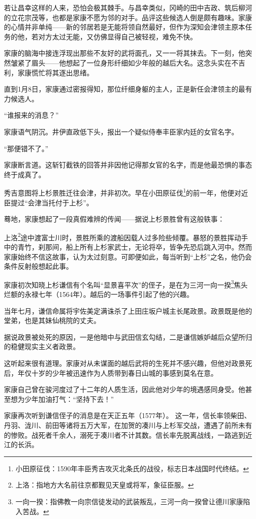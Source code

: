 \documentclass[
]{article}
\begin{document}
若让昌幸这样的人来，恐怕会极其棘手。与昌幸类似，冈崎的田中吉政、筑后柳河的立花宗茂等，也都是家康不愿为邻的对手。品评这些候选人倒是颇有趣味。家康的心情并非单纯------新的邻居若是无能将领自然最好，但作为深知会津领主原本任务的他，若对方太过无能，又仿佛显得自己被轻视，难免不快。

家康的脑海中接连浮现出那些不友好的武将面孔，又一一将其抹去。下一刻，他突然皱紧了眉头------他想起了一位身形纤细如少年般的越后大名。这念头实在不吉利，家康慌忙将其逐出思绪。

直到1月8日，家康通过密报得知，那位纤细身躯的主人，正是新任会津领主的最有力候选人。

``谁报来的消息？''

家康语气阴沉。井伊直政低下头，报出一个疑似侍奉丰臣家内廷的女官名字。

``那便错不了。''

家康断言道。这斩钉截铁的回答并非因他记得那女官的名字，而是他最恐惧的事态终于成真了。

秀吉意图将上杉景胜迁往会津，并非初次。早在小田原征伐\footnote{小田原征伐：1590年丰臣秀吉攻灭北条氏的战役，标志日本战国时代终结。}的前一年，他便对近臣提过``会津当托付于上杉''。

蓦地，家康想起了一段真假难辨的传闻------据说上杉景胜曾有这般轶事：

上洛\footnote{上洛：指地方大名前往京都觐见天皇或将军，象征臣服。}途中渡富士川时，景胜所乘的渡船因载人过多险些倾覆。暴怒的景胜挥动手中的青竹，刹那间，船上所有上杉家武士，无论将卒，皆争先恐后跳入河中。然而家康始终不信这故事，认为太过刻意。可即便如此，每当听到``上杉''之名，他仍会条件反射般想起此事。

家康初次知晓上杉谦信有个名叫``显景喜平次''的侄子，是在为三河一向一揆\footnote{一向一揆：指佛教一向宗信徒发动的武装叛乱，三河一向一揆曾让德川家康陷入苦战。}焦头烂额的永禄七年（1564年）。越后的一场事件引起了他的兴趣。

当年七月，谦信命属将宇佐美定满诛杀了上田庄坂户城主长尾政景。政景既是他的堂弟，也是其妹仙桃院的丈夫。

据说政景被处死的原因，一是他暗中与武田信玄勾结，二是谦信嫉妒越后众望所归的稳健现实主义者政景。

这听起来很有道理。家康对从未谋面的越后武将的生死并不感兴趣，但他对政景死后，年仅十岁的少年被迅速作为人质带到春日山城的事感到莫名在意。

家康自己曾在骏河度过了十二年的人质生活，因此他对少年的境遇感同身受。他甚至想为少年加油打气：``坚持下去！''

家康再次听到谦信侄子的消息是在天正五年（1577年）。
这一年，信长率领柴田、丹羽、泷川、前田等诸将五万大军，在加贺的凑川与上杉军交战，遭遇了前所未有的惨败。战死者千余人，溺死于凑川者不计其数。信长率先脱离战线，一路逃到近江的长浜。
\end{document}
